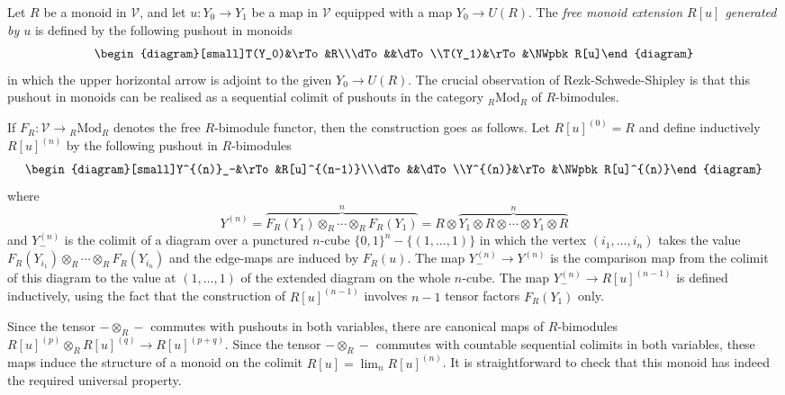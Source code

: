 \documentclass[10pt]{amsart}
\theoremstyle{plain}
\theoremstyle{remark}
\def\Vv{\mathcal{V}}
\def\Mod{\mathrm{Mod}}
\begin{document}
Let $R$ be a monoid in $\Vv$, and let $u:Y_0\to Y_1$ be a map in $\Vv$ equipped with a map $Y_0\to U(R)$. The \emph{free monoid extension $R[u]$ generated by $u$} is defined by the following pushout in monoids
\begin{gather*}\begin{diagram}[small]T(Y_0)&\rTo&R\\\dTo&&\dTo\\T(Y_1)&\rTo&\NWpbk R[u]\end{diagram}\end{gather*}in which the upper horizontal arrow is adjoint to the given $Y_0\to U(R)$. The crucial observation of Rezk-Schwede-Shipley \cite{SS} is that this pushout in monoids can be realised as a sequential colimit of pushouts in the category ${}_R\Mod_R$ of $R$-bimodules.

If $F_R:\Vv\to{}_R\Mod_R$ denotes the free $R$-bimodule functor, then the construction goes as follows. Let $R[u]^{(0)}=R$ and define inductively $R[u]^{(n)}$ by the following pushout in $R$-bimodules
\begin{gather*}\begin{diagram}[small]Y^{(n)}_-&\rTo&R[u]^{(n-1)}\\\dTo&&\dTo\\Y^{(n)}&\rTo&\NWpbk R[u]^{(n)}\end{diagram}\end{gather*}
where $$Y^{(n)}=\overbrace{F_R(Y_1)\otimes_R\cdots\otimes_RF_R(Y_1)}^n=R\otimes \overbrace{Y_1\otimes R\otimes\cdots\otimes Y_1\otimes R}^n$$
and $Y_-^{(n)}$ is the colimit of a diagram over a punctured $n$-cube $\{0,1\}^n-\{(1,\dots,1)\}$ in which the vertex $(i_1,\dots,i_n)$ takes the value $F_R(Y_{i_1})\otimes_R\cdots\otimes_RF_R(Y_{i_n})$ and the edge-maps are induced by $F_R(u)$. The map $Y^{(n)}_-\to Y^{(n)}$ is the comparison map from the colimit of this diagram to the value at $(1,\dots,1)$ of the extended diagram on the whole $n$-cube. The map $Y^{(n)}_-\to R[u]^{(n-1)}$ is defined inductively, using the fact that the construction of $R[u]^{(n-1)}$ involves $n-1$ tensor factors $F_R(Y_1)$ only.

Since the tensor $-\otimes_R-$ commutes with pushouts in both variables, there are canonical maps of $R$-bimodules $R[u]^{(p)}\otimes_R R[u]^{(q)}\to R[u]^{(p+q)}$. Since the tensor $-\otimes_R-$ commutes with countable sequential colimits in both variables, these maps induce the structure of a monoid on the colimit $R[u]=\lim_nR[u]^{(n)}$. It is straightforward to check that this monoid has indeed the required universal property.
\end{document}
